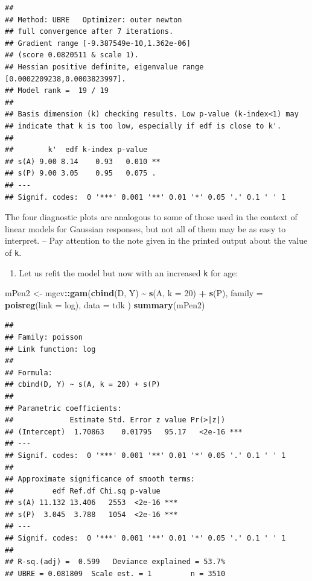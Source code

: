 \documentclass[
]{book}
\newenvironment{Shaded}{\begin{snugshade}}{\end{snugshade}}
\newcommand{\AttributeTok}[1]{\textcolor[rgb]{0.13,0.29,0.53}{#1}}
\newcommand{\DecValTok}[1]{\textcolor[rgb]{0.00,0.00,0.81}{#1}}
\newcommand{\FunctionTok}[1]{\textcolor[rgb]{0.13,0.29,0.53}{\textbf{#1}}}
\newcommand{\NormalTok}[1]{#1}
\newcommand{\OtherTok}[1]{\textcolor[rgb]{0.56,0.35,0.01}{#1}}
\newcommand{\SpecialCharTok}[1]{\textcolor[rgb]{0.81,0.36,0.00}{\textbf{#1}}}
\providecommand{\tightlist}{%
  \setlength{\itemsep}{0pt}\setlength{\parskip}{0pt}}
\begin{document}
\begin{verbatim}
## 
## Method: UBRE   Optimizer: outer newton
## full convergence after 7 iterations.
## Gradient range [-9.387549e-10,1.362e-06]
## (score 0.0820511 & scale 1).
## Hessian positive definite, eigenvalue range [0.0002209238,0.0003823997].
## Model rank =  19 / 19 
## 
## Basis dimension (k) checking results. Low p-value (k-index<1) may
## indicate that k is too low, especially if edf is close to k'.
## 
##        k'  edf k-index p-value   
## s(A) 9.00 8.14    0.93   0.010 **
## s(P) 9.00 3.05    0.95   0.075 . 
## ---
## Signif. codes:  0 '***' 0.001 '**' 0.01 '*' 0.05 '.' 0.1 ' ' 1
\end{verbatim}

The four diagnostic plots are analogous to some of those used in
the context of linear models for Gaussian responses, but not all of them
may be as easy to interpret. -- Pay attention to the note
given in the printed output about the value of \texttt{k}.

\begin{enumerate}
\def\labelenumi{\arabic{enumi}.}
\setcounter{enumi}{3}
\tightlist
\item
  Let us refit the model but now with an increased \texttt{k} for age:
\end{enumerate}

\begin{Shaded}
\begin{Highlighting}[]
\NormalTok{mPen2 }\OtherTok{\textless{}{-}}\NormalTok{ mgcv}\SpecialCharTok{::}\FunctionTok{gam}\NormalTok{(}\FunctionTok{cbind}\NormalTok{(D, Y) }\SpecialCharTok{\textasciitilde{}} \FunctionTok{s}\NormalTok{(A, }\AttributeTok{k =} \DecValTok{20}\NormalTok{) }\SpecialCharTok{+} \FunctionTok{s}\NormalTok{(P),}
  \AttributeTok{family =} \FunctionTok{poisreg}\NormalTok{(}\AttributeTok{link =}\NormalTok{ log), }\AttributeTok{data =}\NormalTok{ tdk}
\NormalTok{)}
\FunctionTok{summary}\NormalTok{(mPen2)}
\end{Highlighting}
\end{Shaded}

\begin{verbatim}
## 
## Family: poisson 
## Link function: log 
## 
## Formula:
## cbind(D, Y) ~ s(A, k = 20) + s(P)
## 
## Parametric coefficients:
##             Estimate Std. Error z value Pr(>|z|)    
## (Intercept)  1.70863    0.01795   95.17   <2e-16 ***
## ---
## Signif. codes:  0 '***' 0.001 '**' 0.01 '*' 0.05 '.' 0.1 ' ' 1
## 
## Approximate significance of smooth terms:
##         edf Ref.df Chi.sq p-value    
## s(A) 11.132 13.406   2553  <2e-16 ***
## s(P)  3.045  3.788   1054  <2e-16 ***
## ---
## Signif. codes:  0 '***' 0.001 '**' 0.01 '*' 0.05 '.' 0.1 ' ' 1
## 
## R-sq.(adj) =  0.599   Deviance explained = 53.7%
## UBRE = 0.081809  Scale est. = 1         n = 3510
\end{verbatim}
\end{document}
